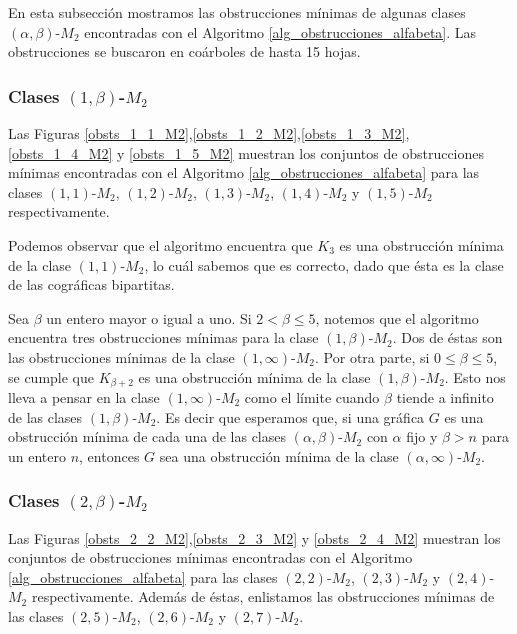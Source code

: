 En esta subsección mostramos las obstrucciones mínimas de algunas clases $(\alpha, \beta)$-$M_2$ encontradas con el Algoritmo \ref{alg_obstrucciones_alfabeta}. Las obstrucciones se buscaron en coárboles de hasta 15 hojas.

\subsubsection{Clases $(1,\beta)$-$M_2$}

Las Figuras \ref{obsts_1_1_M2},\ref{obsts_1_2_M2},\ref{obsts_1_3_M2},\ref{obsts_1_4_M2} y \ref{obsts_1_5_M2} muestran los conjuntos de obstrucciones mínimas encontradas con el Algoritmo \ref{alg_obstrucciones_alfabeta} para las clases $(1,1)$-$M_2$, $(1,2)$-$M_2$, $(1,3)$-$M_2$, $(1,4)$-$M_2$ y $(1,5)$-$M_2$ respectivamente.







Podemos observar que el algoritmo encuentra que $K_3$ es una obstrucción mínima de la clase $(1,1)$-$M_2$, lo cuál sabemos que es correcto, dado que ésta es la clase de las cográficas bipartitas. 

Sea $\beta$ un entero mayor o igual a uno. Si $2<\beta\le 5$, notemos que el algoritmo encuentra tres obstrucciones mínimas para la clase $(1,\beta)$-$M_2$. Dos de éstas son las obstrucciones mínimas de la clase $(1,\infty)$-$M_2$. Por otra parte, si $0\le\beta\le 5$, se cumple que $K_{\beta+2}$ es una obstrucción  mínima de la clase $(1,\beta)$-$M_2$. Esto nos lleva a pensar en la clase $(1,\infty)$-$M_2$ como el límite cuando $\beta$ tiende a infinito de las clases $(1,\beta)$-$M_2$. Es decir que esperamos que, si una gráfica $G$ es una obstrucción mínima de cada una de las clases $(\alpha,\beta)$-$M_2$ con $\alpha$ fijo y $\beta>n$ para un entero $n$, entonces $G$ sea una obstrucción mínima de la clase $(\alpha,\infty)$-$M_2$.

\subsubsection{Clases $(2,\beta)$-$M_2$}

Las Figuras \ref{obsts_2_2_M2},\ref{obsts_2_3_M2} y \ref{obsts_2_4_M2} muestran los conjuntos de obstrucciones mínimas encontradas con el Algoritmo \ref{alg_obstrucciones_alfabeta} para las clases $(2,2)$-$M_2$, $(2,3)$-$M_2$ y $(2,4)$-$M_2$ respectivamente. Además de éstas, enlistamos las obstrucciones mínimas de las clases $(2,5)$-$M_2$, $(2,6)$-$M_2$ y $(2,7)$-$M_2$.

